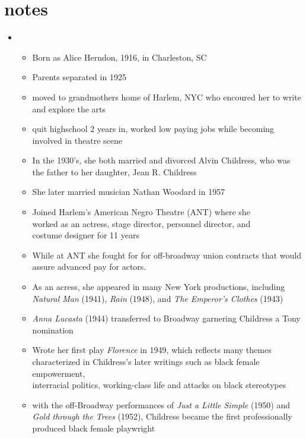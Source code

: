 \documentclass[12pt]{article}
\begin{document}
    \section{notes}
        \begin{itemize}
            \item {}
            \begin{itemize}
                \item Born as Alice Herndon, 1916, in Charleston, SC
                \item Parents separated in 1925
                \item moved to grandmothers home of Harlem, NYC who encoured her to write and explore the arts
                \item quit highschool 2 years in, worked low paying jobs while becoming involved in theatre scene
                \item In the 1930's, she both married and divorced Alvin Childress, who was the father to her daughter, Jean R. Childress
                \item She later married musician Nathan Woodard in 1957
                \item Joined Harlem's American Negro Theatre (ANT) where she \\worked as an actress, stage director, personnel director, and \\costume designer for 11 years
                \item While at ANT she fought for for off-broadway union contracts that would assure advanced pay for actors.
                \item As an acress, she appeared in many New York productions, including \textit{Natural Man} (1941), \textit{Rain} (1948), and \textit{The Emperor's Clothes} (1943)
                \item \textit{Anna Lucasta} (1944) transferred to Broadway garnering Childress a Tony nomination
                \item Wrote her first play \textit{Florence} in 1949, which reflects many themes characterized in Childress's later writings such as black female empowerment, \\ interracial politics, working-class life and attacks on black stereotypes
				\item with the off-Broadway performances of \textit{Just a Little Simple} (1950) and \textit{Gold through the Trees} (1952), Childress became the first professionally produced black female playwright

\end{itemize}
\end{itemize}
\end{document}
